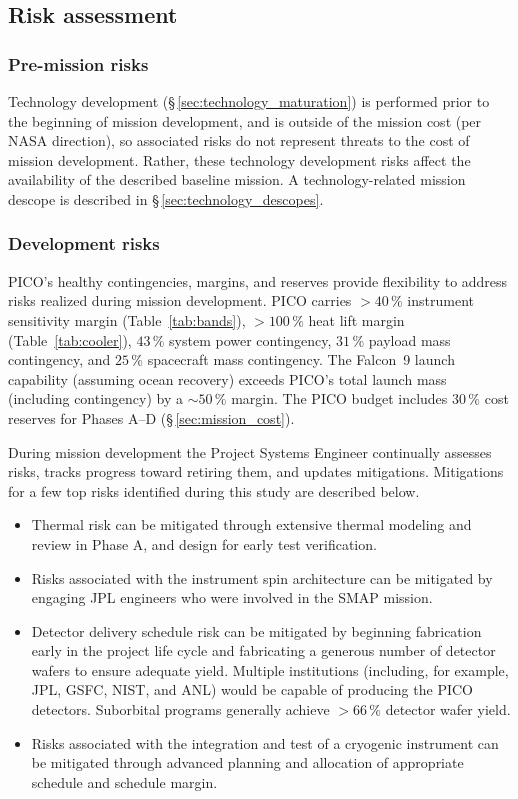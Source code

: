 \subsection{Risk assessment}
\label{sec:risk_assessment} %

\subsubsection{Pre-mission risks}
\label{sec:premission_risks} %

Technology development (\S\,\ref{sec:technology_maturation}) is
performed prior to the beginning of mission development, and is
outside of the mission cost (per NASA direction), so associated risks
do not represent threats to the cost of mission development. Rather,
these technology development risks affect 
the availability of the described baseline
mission. A technology-related mission descope is described in
\S\,\ref{sec:technology_descopes}.

\subsubsection{Development risks}
\label{sec:development_risks} %

PICO's healthy contingencies, margins, and reserves provide
flexibility to address risks realized during mission development. PICO
carries $>40\,\%$ instrument sensitivity margin (Table~\ref{tab:bands}),
$>100\,\%$ heat lift margin (Table~\ref{tab:cooler}), $43\,\%$ system
power contingency, $31\,\%$ payload mass contingency, and $25\,\%$
spacecraft mass contingency. The Falcon~9 launch capability (assuming ocean
recovery) exceeds PICO's total launch mass (including contingency) by
a $\sim 50\,\%$ margin. The PICO budget includes $30\,\%$ cost
reserves for Phases A--D (\S\,\ref{sec:mission_cost}).

During mission development the Project Systems Engineer continually
assesses risks, tracks progress toward retiring them, and updates
mitigations. Mitigations for a few top risks identified during this
study are described below.
\begin{itemize}
\item Thermal risk can be mitigated through extensive thermal modeling and
review in Phase A, and design for early test verification. 
\item Risks
associated with the instrument spin architecture can be mitigated by
engaging JPL engineers who were involved in the SMAP mission.
\item  Detector
delivery schedule risk can be mitigated by beginning fabrication early
in the project life cycle and fabricating a generous number of
detector wafers to ensure adequate yield. Multiple institutions (including, for example, JPL, GSFC, NIST, and ANL) would be capable of producing the PICO detectors. Suborbital programs generally achieve $>66\,\%$ detector wafer yield.
\item Risks associated with the
integration and test of a cryogenic instrument can be mitigated
through advanced planning and allocation of appropriate schedule and
schedule margin.
\end{itemize}

